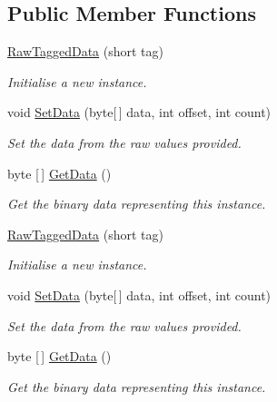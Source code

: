 \subsection*{Public Member Functions}
\begin{DoxyCompactItemize}
\item 
\hyperlink{class_i_c_sharp_code_1_1_sharp_zip_lib_1_1_zip_1_1_raw_tagged_data_a0f9b5696c2620e36dbef24d91b4ebc39}{Raw\+Tagged\+Data} (short tag)
\begin{DoxyCompactList}\small\item\em Initialise a new instance. \end{DoxyCompactList}\item 
void \hyperlink{class_i_c_sharp_code_1_1_sharp_zip_lib_1_1_zip_1_1_raw_tagged_data_a7fc6606abe9e096e6a1d6633cd7788ca}{Set\+Data} (byte\mbox{[}$\,$\mbox{]} data, int offset, int count)
\begin{DoxyCompactList}\small\item\em Set the data from the raw values provided. \end{DoxyCompactList}\item 
byte \mbox{[}$\,$\mbox{]} \hyperlink{class_i_c_sharp_code_1_1_sharp_zip_lib_1_1_zip_1_1_raw_tagged_data_acd58d127e920dae4d94b2e396a6fc91c}{Get\+Data} ()
\begin{DoxyCompactList}\small\item\em Get the binary data representing this instance. \end{DoxyCompactList}\item 
\hyperlink{class_i_c_sharp_code_1_1_sharp_zip_lib_1_1_zip_1_1_raw_tagged_data_a0f9b5696c2620e36dbef24d91b4ebc39}{Raw\+Tagged\+Data} (short tag)
\begin{DoxyCompactList}\small\item\em Initialise a new instance. \end{DoxyCompactList}\item 
void \hyperlink{class_i_c_sharp_code_1_1_sharp_zip_lib_1_1_zip_1_1_raw_tagged_data_a7fc6606abe9e096e6a1d6633cd7788ca}{Set\+Data} (byte\mbox{[}$\,$\mbox{]} data, int offset, int count)
\begin{DoxyCompactList}\small\item\em Set the data from the raw values provided. \end{DoxyCompactList}\item 
byte \mbox{[}$\,$\mbox{]} \hyperlink{class_i_c_sharp_code_1_1_sharp_zip_lib_1_1_zip_1_1_raw_tagged_data_acd58d127e920dae4d94b2e396a6fc91c}{Get\+Data} ()
\begin{DoxyCompactList}\small\item\em Get the binary data representing this instance. \end{DoxyCompactList}\end{DoxyCompactItemize}
